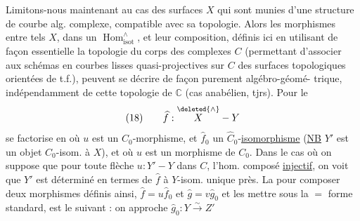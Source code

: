Limitons-nous maintenant au cas des
surfaces $X$ qui sont munies d'une structure
de courbe alg. complexe, compatible avec sa
topologie. Alors les morphismes entre tels
$X$, dans un $\operatorname{Hom}^{\wedge}_{\mathrm{isot}}$, et leur composition,
définis ici en utilisant de façon essentielle
la topologie du corps des complexes $C$
(permettant d'associer aux schémas en courbes
lisses quasi-projectives sur $C$ des surfaces
topologiques orientées de t.f.), peuvent se
décrire de façon purement algébro-géomé-
trique, indépendamment de cette topologie
de $\mathbb C$ (cas anabélien, tjrs). Pour le
\[
(18)\qquad\widehat f:\overset{\deleted{\wedge}}{X}\mathbin{-}Y
\]
se factorise en
où $u$ est un $C_0$-morphisme, et $\widehat f_0$ un $\widehat C_0$-\uline{isomorphisme}
(\uline{NB} $Y'$ est un objet $C_0$-isom. à $X$), et où $u$ est
un morphisme de $C_0$. Dans le cas où on
suppose que pour toute flèche $u:Y'\mathbin{-}Y$ dans $C$,
l'hom. composé
\uline{injectif}, on voit que $Y'$ est déterminé
en termes de $\widehat f$ à $Y$-isom. unique près.  La
  pour composer deux morphismes définis
ainsi, $\widehat f=u\widehat f_0$ et $\widehat g=v\widehat g_0$
et les mettre sous la $=$ forme standard,
est le suivant : on approche $\widehat g_0:Y\overset{\sim}{\longrightarrow}Z'$
